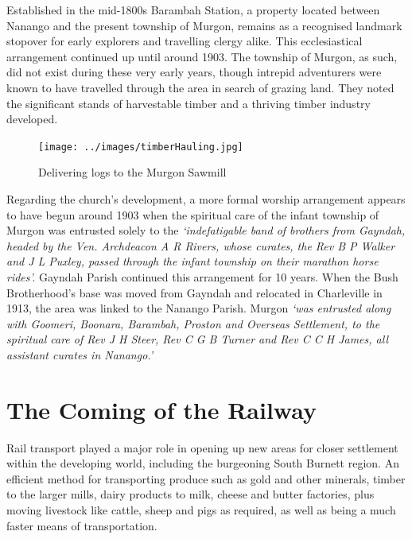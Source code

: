 Established in the mid-1800s Barambah Station, a property located between Nanango and the present township of Murgon, remains as a recognised landmark stopover for early explorers and travelling clergy alike. This ecclesiastical arrangement continued up until around 1903. The township of Murgon, as such, did not exist during these very early years, though intrepid adventurers were known to have travelled through the area in search of grazing land. They noted the significant stands of harvestable timber and a thriving timber industry developed.









\begin{figure}
\begin{center}
\texttt{[image: ../images/timberHauling.jpg]}
\caption{Delivering logs to the Murgon Sawmill}
\end{center}
\end{figure}




Regarding the church's development, a more formal worship arrangement appears to have begun around 1903 when the spiritual care of the infant township of Murgon was entrusted solely to the \emph{`indefatigable band of brothers from Gayndah, headed by the Ven. Archdeacon A R Rivers, whose curates, the Rev B P Walker and J L Puxley, passed through the infant township on their marathon horse rides'.} Gayndah Parish continued this arrangement for 10 years. When the Bush Brotherhood's base was moved from Gayndah and relocated in Charleville in 1913, the area was linked to the Nanango Parish. Murgon \emph{`was entrusted along with Goomeri, Boonara, Barambah, Proston and Overseas Settlement, to the spiritual care of Rev J H Steer, Rev C G B Turner and Rev C C H James, all assistant curates in Nanango.'}



\section{The Coming of the Railway}



Rail transport played a major role in opening up new areas for closer settlement within the developing world, including the burgeoning South Burnett region. An efficient method for transporting produce such as gold and other minerals, timber to the larger mills, dairy products to milk, cheese and butter factories, plus moving livestock like cattle, sheep and pigs as required, as well as being a much faster means of transportation.




